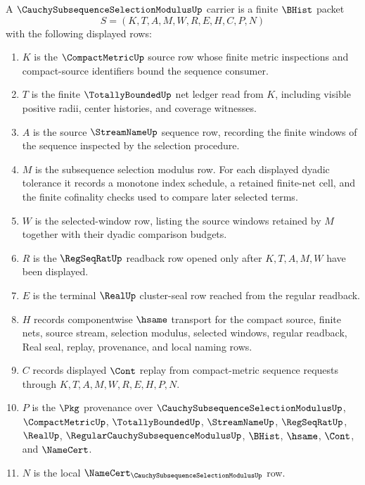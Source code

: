\begin{definition}
\label{def:cauchy-subsequence-selection-modulus-carrier}
A $\CauchySubsequenceSelectionModulusUp$ carrier is a finite $\BHist$ packet
$$
S=(K,T,A,M,W,R,E,H,C,P,N)
$$
with the following displayed rows:
\begin{enumerate}
\item $K$ is the $\CompactMetricUp$ source row whose finite metric inspections and compact-source identifiers bound the sequence consumer.
\item $T$ is the finite $\TotallyBoundedUp$ net ledger read from $K$, including visible positive radii, center histories, and coverage witnesses.
\item $A$ is the source $\StreamNameUp$ sequence row, recording the finite windows of the sequence inspected by the selection procedure.
\item $M$ is the subsequence selection modulus row. For each displayed dyadic tolerance it records a monotone index schedule, a retained finite-net cell, and the finite cofinality checks used to compare later selected terms.
\item $W$ is the selected-window row, listing the source windows retained by $M$ together with their dyadic comparison budgets.
\item $R$ is the $\RegSeqRatUp$ readback row opened only after $K,T,A,M,W$ have been displayed.
\item $E$ is the terminal $\RealUp$ cluster-seal row reached from the regular readback.
\item $H$ records componentwise $\hsame$ transport for the compact source, finite nets, source stream, selection modulus, selected windows, regular readback, Real seal, replay, provenance, and local naming rows.
\item $C$ records displayed $\Cont$ replay from compact-metric sequence requests through $K,T,A,M,W,R,E,H,P,N$.
\item $P$ is the $\Pkg$ provenance over $\CauchySubsequenceSelectionModulusUp$, $\CompactMetricUp$, $\TotallyBoundedUp$, $\StreamNameUp$, $\RegSeqRatUp$, $\RealUp$, $\RegularCauchySubsequenceModulusUp$, $\BHist$, $\hsame$, $\Cont$, and $\NameCert$.
\item $N$ is the local $\NameCert_{\CauchySubsequenceSelectionModulusUp}$ row.
\end{enumerate}
\end{definition}

